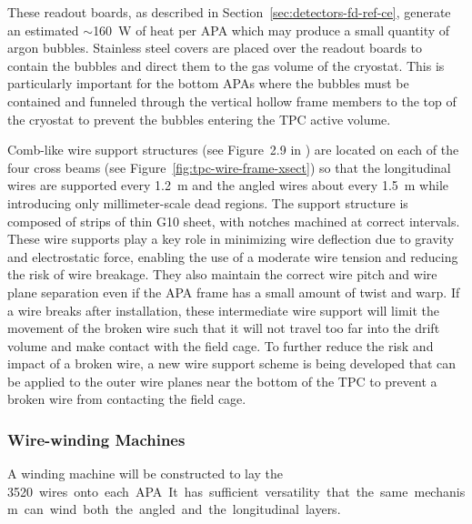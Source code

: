 These readout boards, as described in
Section~\ref{sec:detectors-fd-ref-ce}, generate an estimated
$\sim$160~W of heat per APA which may produce a small quantity of
argon bubbles.  Stainless steel covers are placed over the readout
boards to contain the bubbles and direct them to the gas volume of the
cryostat. This is particularly important for the bottom APAs where the
bubbles must be contained and funneled through the vertical hollow
frame members to the top of the cryostat to prevent the bubbles
entering the TPC active volume.

Comb-like wire support structures (see Figure~2.9 in \anxlbnefd) are
located on each of the four cross beams (see Figure~\ref{fig:tpc-wire-frame-xsect})
 so that the longitudinal wires
are supported every 1.2~m and the angled wires about every 1.5~m while
introducing only millimeter-scale dead regions. The support structure
is composed of strips of thin G10 sheet, with notches machined at
correct intervals.  These wire supports play a key role in minimizing
wire deflection due to gravity and electrostatic force, enabling the
use of a moderate wire tension and reducing the risk of wire breakage.
They also maintain the correct wire pitch and wire plane separation
even if the APA frame has a small amount of twist and warp.  If a wire
breaks after installation, these intermediate wire support will limit
the movement of the broken wire such that it will not travel too far
into the drift volume and make contact with the field cage.  To
further reduce the risk and impact of a broken wire, a new wire
support scheme is being developed that can be applied to the outer
wire planes near the bottom of the TPC to prevent a broken wire from
contacting the field cage.


\subsubsection{Wire-winding Machines}
\label{subsec:fd-ref-wirewinding}

A winding machine will be constructed to lay the \SI{3520} wires onto each
APA. It has sufficient versatility that the same mechanism can wind
both the angled and the longitudinal layers.
 
